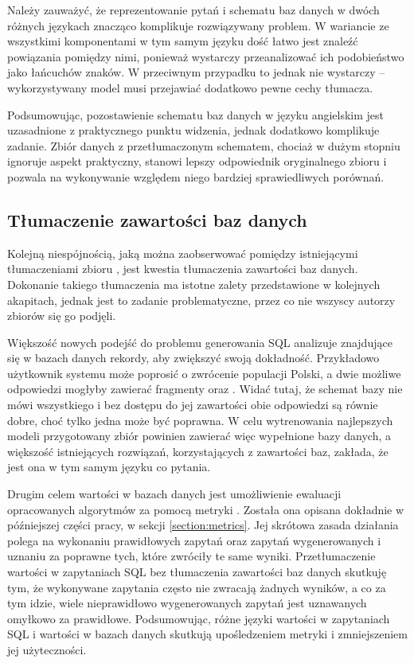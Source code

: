 Należy zauważyć, że reprezentowanie pytań i schematu baz danych w dwóch różnych językach znacząco komplikuje rozwiązywany problem. W wariancie ze wszystkimi komponentami w tym samym języku dość łatwo jest znaleźć powiązania pomiędzy nimi, ponieważ wystarczy przeanalizować ich podobieństwo jako łańcuchów znaków. W przeciwnym przypadku to jednak nie wystarczy -- wykorzystywany model musi przejawiać dodatkowo pewne cechy tłumacza.

Podsumowując, pozostawienie schematu baz danych w języku angielskim jest uzasadnione z praktycznego punktu widzenia, jednak dodatkowo komplikuje zadanie. Zbiór danych z przetłumaczonym schematem, chociaż w dużym stopniu ignoruje aspekt praktyczny, stanowi lepszy odpowiednik oryginalnego zbioru  i pozwala na wykonywanie względem niego bardziej sprawiedliwych porównań.

\subsection{Tłumaczenie zawartości baz danych}
Kolejną niespójnością, jaką można zaobserwować pomiędzy istniejącymi tłumaczeniami zbioru , jest kwestia tłumaczenia zawartości baz danych. Dokonanie takiego tłumaczenia ma istotne zalety przedstawione w kolejnych akapitach, jednak jest to zadanie problematyczne, przez co nie wszyscy autorzy zbiorów się go podjęli.

Większość nowych podejść do problemu generowania SQL analizuje znajdujące się w bazach danych rekordy, aby zwiększyć swoją dokładność. Przykładowo użytkownik systemu może poprosić o zwrócenie populacji Polski, a dwie możliwe odpowiedzi mogłyby zawierać fragmenty  oraz . Widać tutaj, że schemat bazy nie mówi wszystkiego i bez dostępu do jej zawartości obie odpowiedzi są równie dobre, choć tylko jedna może być poprawna. W celu wytrenowania najlepszych modeli przygotowany zbiór powinien zawierać więc wypełnione bazy danych, a większość istniejących rozwiązań, korzystających z zawartości baz, zakłada, że jest ona w tym samym języku co pytania.

Drugim celem wartości w bazach danych jest umożliwienie ewaluacji opracowanych algorytmów  za pomocą metryki . Została ona opisana dokładnie w późniejszej części pracy, w sekcji \ref{section:metrics}. Jej skrótowa zasada działania polega na wykonaniu prawidłowych zapytań oraz zapytań wygenerowanych i uznaniu za poprawne tych, które zwróciły te same wyniki. Przetłumaczenie wartości w zapytaniach SQL bez tłumaczenia zawartości baz danych skutkuję tym, że wykonywane zapytania często nie zwracają żadnych wyników, a co za tym idzie, wiele nieprawidłowo wygenerowanych zapytań jest uznawanych omyłkowo za prawidłowe. Podsumowując, różne języki wartości w zapytaniach SQL i wartości w bazach danych skutkują upośledzeniem metryki  i zmniejszeniem jej użyteczności.

